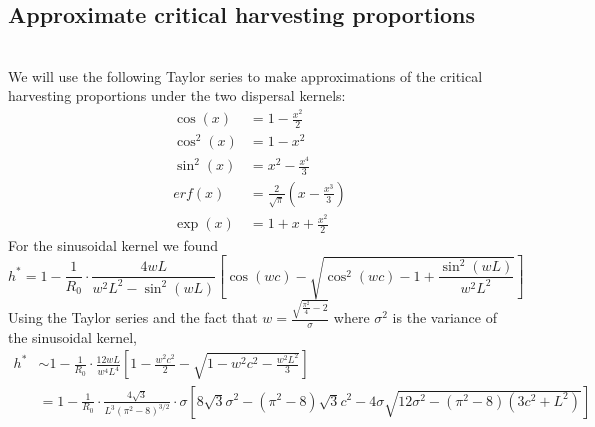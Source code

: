 \documentclass[12pt,english]{article}
\begin{document}
\subsection{Approximate critical harvesting proportions \label{approxcrit}}
~\\We will use the following Taylor series to make approximations of the critical harvesting proportions under the two dispersal kernels:
\begin{align*}
\cos(x)&=1-\frac{x^2}{2}
\\ \cos^2(x)&=1-x^2
\\ \sin^2(x)&=x^2-\frac{x^4}{3}
\\ erf(x)&=\frac{2}{\sqrt{\pi}}(x-\frac{x^3}{3})
\\ \exp(x)&=1+x+\frac{x^2}{2}
\end{align*}
For the sinusoidal kernel we found 
\begin{equation}
h^*=1-\frac{1}{R_0}\cdot\frac{4wL}{w^2L^2-\sin^2(wL)}\left[\cos(wc)-\sqrt{\cos^2(wc)-1+\frac{\sin^2(wL)}{w^2L^2}}\right] 
\end{equation} 
Using the Taylor series and the fact that $w=\frac{\sqrt{\frac{\pi^2}{4}-2}}{\sigma}$ where $\sigma^2$ is the variance of the sinusoidal kernel,
\begin{align*}
h^*&\sim 1-\frac{1}{R_0}\cdot\frac{12wL}{w^4L^4}\left[1-\frac{w^2c^2}{2}-\sqrt{1-w^2c^2-\frac{w^2L^2}{3}}\right]
\\&=1-\frac{1}{R_0}\cdot\frac{4\sqrt{3}}{L^3(\pi^2-8)^{3/2}}\cdot\sigma\left[8\sqrt{3}\sigma^2-(\pi^2-8)\sqrt{3}c^2-4\sigma\sqrt{12\sigma^2-(\pi^2-8)(3c^2+L^2)}\right]
\end{align*}
\end{document}
